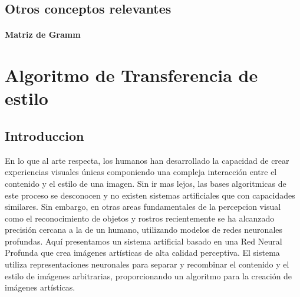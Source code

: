 \documentclass[a4paper,11pt,spanish]{book}
\begin{document}
     \section {Otros conceptos relevantes}
	\subsubsection{Matriz de Gramm}

\chapter{Algoritmo de Transferencia de estilo}
    \section{Introduccion}
      En lo que al arte respecta, los humanos han desarrollado la capacidad de crear experiencias visuales únicas componiendo una compleja interacción entre el contenido y el estilo de una imagen.
    Sin ir mas lejos, las bases algoritmicas de este proceso se desconocen y no existen sistemas artificiales que con capacidades similares. Sin embargo, en otras areas fundamentales
    de la percepcion visual como el reconocimiento de objetos y rostros recientemente se ha alcanzado precisión cercana a la de un humano, utilizando modelos de redes neuronales profundas. 
    Aquí presentamos un sistema artificial basado en una Red Neural Profunda que crea imágenes artísticas de alta calidad perceptiva. El sistema utiliza representaciones neuronales 
    para separar y recombinar el contenido y el estilo de imágenes arbitrarias, proporcionando un algoritmo para la creación de imágenes artísticas.
\end{document}
